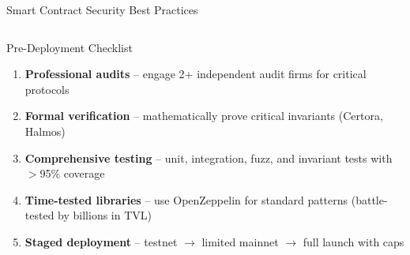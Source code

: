 \documentclass[8pt,aspectratio=169]{beamer}
\begin{document}
\begin{frame}{Smart Contract Security Best Practices}
\begin{columns}[T]
\begin{block}{Pre-Deployment Checklist}
\footnotesize
\begin{enumerate}
  \item \textcolor{mlblue}{\textbf{Professional audits}} -- engage 2+ independent audit firms for critical protocols
  \item \textcolor{mlgreen}{\textbf{Formal verification}} -- mathematically prove critical invariants (Certora, Halmos)
  \item \textcolor{mlorange}{\textbf{Comprehensive testing}} -- unit, integration, fuzz, and invariant tests with $>$95\% coverage
  \item \textcolor{mlpurple}{\textbf{Time-tested libraries}} -- use OpenZeppelin for standard patterns (battle-tested by billions in TVL)
  \item \textcolor{mlred}{\textbf{Staged deployment}} -- testnet $\rightarrow$ limited mainnet $\rightarrow$ full launch with caps
\end{enumerate}
\end{block}


\end{columns}
\end{frame}
\end{document}

